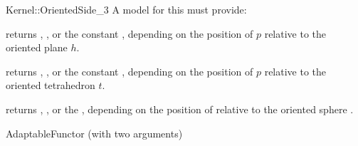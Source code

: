 \begin{ccRefFunctionObjectConcept}{Kernel::OrientedSide_3}
A model for this must provide:


{returns ,
, or the constant ,
depending on the position of $p$  relative to the oriented plane $h$.}

{returns ,
, or the constant ,
depending on the position of $p$  relative to the oriented tetrahedron $t$.}

{returns ,
, or the ,
depending on the position of   relative to the oriented sphere .}

\ccRefines
AdaptableFunctor (with two arguments)

\ccSeeAlso
{} \\
 \\
 \\

\end{ccRefFunctionObjectConcept}
